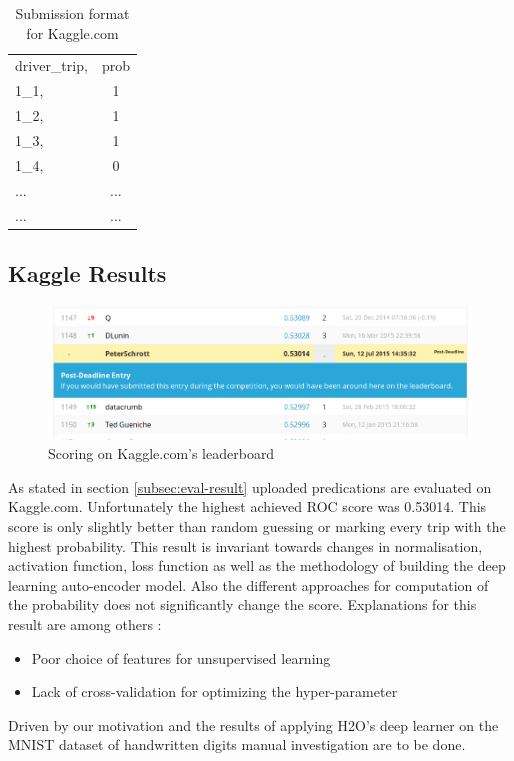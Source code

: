 \documentclass{vldb}
\begin{document}
\begin{table}
\centering
\begin{tabular}{l c}
driver\_trip, & prob\\
1\_1,& 1\\
1\_2,& 1\\
1\_3,& 1\\
1\_4,& 0\\
... & ... \\
... & ... \\
\end{tabular}
\caption{Submission format for Kaggle.com}
\label{table:kaggle-submission}
\end{table}


\subsection{Kaggle Results}

\begin{figure}
\centering
\includegraphics[width=\linewidth]{"pics/kaggle-result"}
\caption{Scoring on Kaggle.com's leaderboard}
\label{fig:kaggle-result}
\end{figure}

As stated in section \ref{subsec:eval-result} uploaded predications are evaluated on Kaggle.com. Unfortunately the highest achieved ROC score was 0.53014. This score is only slightly better than random guessing or marking every trip with the highest probability. This result is invariant towards changes in normalisation, activation function, loss function as well as the methodology of building the deep learning auto-encoder model. Also the different approaches for computation of the probability does not significantly change the score. Explanations for this result are among others :
\begin{itemize}
\item Poor choice of features for unsupervised learning
\item Lack of cross-validation for optimizing the hyper-pa\-ra\-me\-ter
\end{itemize}
Driven by our motivation and the results of applying H2O's deep learner on the MNIST dataset of handwritten digits manual investigation are to be done. 
\end{document}
